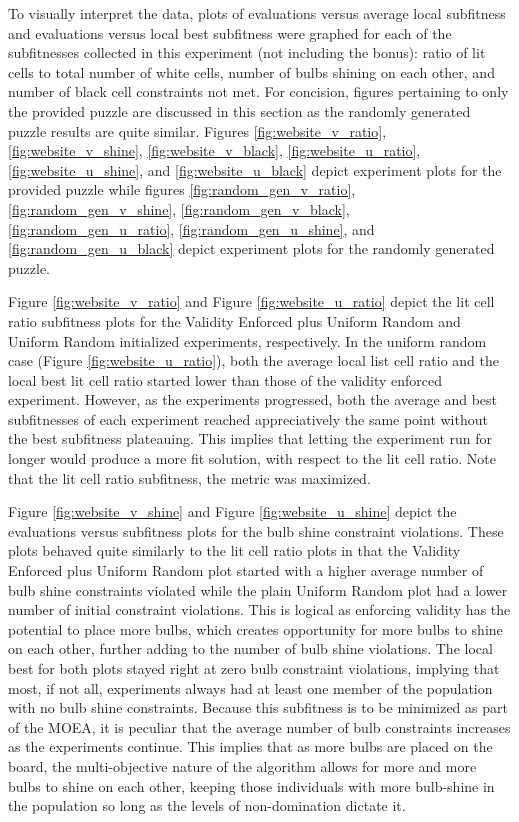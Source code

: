 \documentclass[11pt]{article}
\begin{document}
To visually interpret the data, plots of evaluations versus average local subfitness and evaluations 
versus local best subfitness were graphed for each of the subfitnesses collected in this experiment (not
including the bonus):
ratio of lit cells to total number of white cells, number of bulbs shining on each other, and 
number of black cell constraints not met. For concision, figures pertaining to only the provided puzzle
are discussed in this section as the randomly generated puzzle results are quite similar. Figures 
\ref{fig:website_v_ratio}, \ref{fig:website_v_shine}, \ref{fig:website_v_black}, 
\ref{fig:website_u_ratio}, \ref{fig:website_u_shine}, and \ref{fig:website_u_black} depict experiment 
plots for the provided puzzle while figures
\ref{fig:random_gen_v_ratio}, \ref{fig:random_gen_v_shine}, \ref{fig:random_gen_v_black},
\ref{fig:random_gen_u_ratio}, \ref{fig:random_gen_u_shine}, and \ref{fig:random_gen_u_black} depict 
experiment plots for the randomly generated puzzle. 

Figure \ref{fig:website_v_ratio} and Figure \ref{fig:website_u_ratio} depict the lit cell ratio subfitness
plots for the Validity Enforced plus Uniform Random and Uniform Random initialized experiments,
respectively. In the uniform random case (Figure \ref{fig:website_u_ratio}), both the average local
list cell ratio and the local best lit cell ratio started lower than those of the validity enforced 
experiment. However, as the experiments progressed, both the average and best subfitnesses of each
experiment reached appreciatively the same point without the best subfitness plateauing. This implies
that letting the experiment run for longer would produce a more fit solution, with respect to
the lit cell ratio. Note that the lit cell ratio subfitness, the metric was maximized.

Figure \ref{fig:website_v_shine} and Figure \ref{fig:website_u_shine} depict the evaluations versus
subfitness plots for the bulb shine constraint violations. These plots behaved quite similarly to the
lit cell ratio plots in that the Validity Enforced plus Uniform Random plot started with a higher average
number of bulb shine constraints violated while the plain Uniform Random plot had a lower number of
initial constraint violations. This is logical as enforcing validity has the potential to place more bulbs,
which creates opportunity for more bulbs
to shine on each other, further adding to the number of bulb shine violations. The local best for both
plots stayed right at zero bulb constraint violations, implying that most, if not all, experiments always had
at least one member of the population with no bulb shine constraints. Because this subfitness is to be
minimized as part of the MOEA, it is peculiar that the average number of bulb constraints increases as 
the experiments continue. This implies that as more bulbs are placed on the board, the multi-objective
nature of the algorithm allows for more and more bulbs to shine on each other, keeping those individuals
with more bulb-shine in the population so long as the levels of non-domination dictate it.
\end{document}
